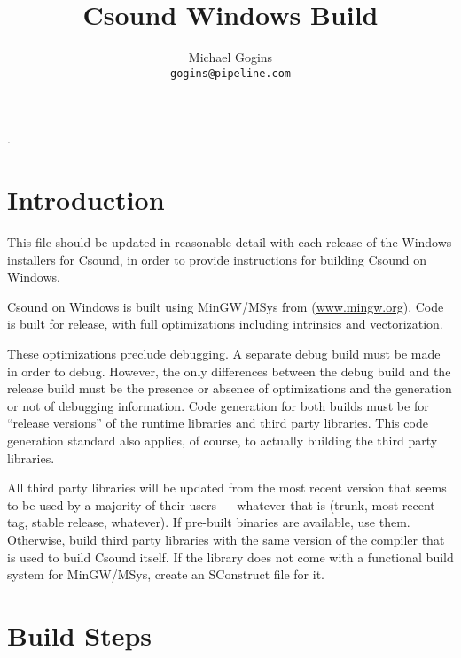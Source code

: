 \documentclass[11pt,letterpaper,onecolumn]{scrartcl}
\begin{document}
\begin{sloppypar}

.
\title{Csound Windows Build}
\author{Michael Gogins \\ \texttt{gogins@pipeline.com}}
\maketitle

\section{Introduction}
\label{sec:Introduction}

This file should be updated in reasonable detail with each release of the Windows installers for Csound, in order to provide instructions for building Csound on Windows.

Csound on Windows is built using MinGW/MSys from (\url{www.mingw.org}). Code is built for release, with full optimizations including intrinsics and vectorization.  

These optimizations preclude debugging. A separate debug build must be made in order to debug. However, the only differences between the debug build and the release build must be the presence or absence of optimizations and the generation or not of debugging information. Code generation for both builds must be for ``release versions'' of the runtime libraries and third party libraries. This code generation standard also applies, of course, to actually building the third party libraries.

All third party libraries will be updated from the most recent version that seems to be used by a majority of their users --- whatever that is (trunk, most recent tag, stable release, whatever). If pre-built binaries are available, use them. Otherwise, build third party libraries with the same version of the compiler that is used to build Csound itself. If the library does not come with a functional build system for MinGW/MSys, create an SConstruct file for it.

\section{Build Steps}
\label{sec:BuildSteps}


\end{sloppypar}
\end{document}
